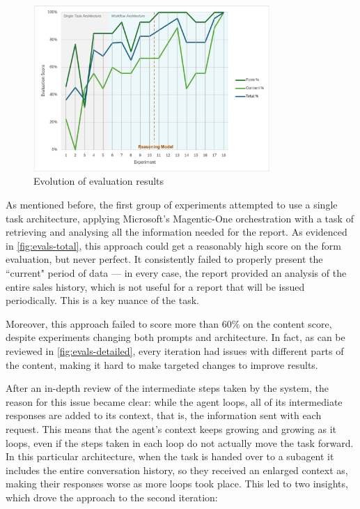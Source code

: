 \documentclass[a4paper]{report}
\begin{document}
\begin{figure}[H]
\centering
\includegraphics[width=0.8\textwidth]{images/evals-combined.png}
\caption{Evolution of evaluation results}
\label{fig:evals-total}
\end{figure}

As mentioned before, the first group of experiments attempted to use a single task architecture, applying Microsoft's Magentic-One orchestration with a task of retrieving and analysing all the information needed for the report. As evidenced in \autoref{fig:evals-total}, this approach could get a reasonably high score on the form evaluation, but never perfect. It consistently failed to properly present the ``current" period of data --- in every case, the report provided an analysis of the entire sales history, which is not useful for a report that will be issued periodically. This is a key nuance of the task.

Moreover, this approach failed to score more than 60\% on the content score, despite experiments changing both prompts and architecture. In fact, as can be reviewed in \autoref{fig:evals-detailed}, every iteration had issues with different parts of the content, making it hard to make targeted changes to improve results.

After an in-depth review of the intermediate steps taken by the system, the reason for this issue became clear: while the agent loops, all of its intermediate responses are added to its context, that is, the information sent with each request. This means that the agent's context keeps growing and growing as it loops, even if the steps taken in each loop do not actually move the task forward. In this particular architecture, when the task is handed over to a subagent it includes the entire conversation history, so they received an enlarged context as, making their responses worse as more loops took place. This led to two insights, which drove the approach to the second iteration:
\end{document}
